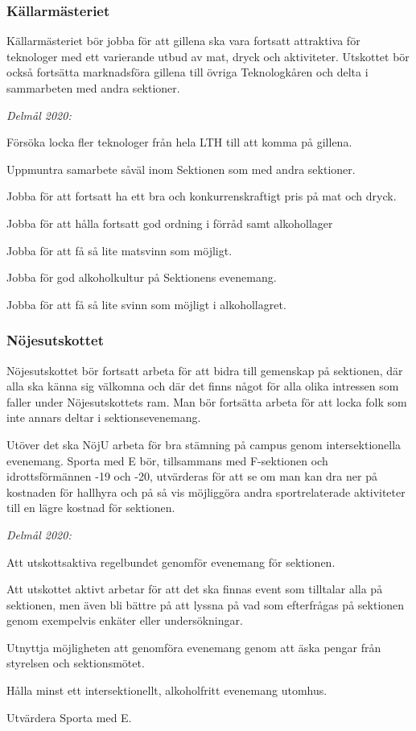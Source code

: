 \documentclass[../_main/handlingar.tex]{subfiles}
\begin{document}
\subsubsection*{Källarmästeriet}
Källarmästeriet bör jobba för att gillena ska vara fortsatt attraktiva för teknologer med ett varierande utbud av mat, dryck och aktiviteter. Utskottet bör också fortsätta marknadsföra gillena till övriga Teknologkåren och delta i sammarbeten med andra sektioner.

\emph{Delmål 2020:}
\begin{dashlist}
	\item Försöka locka fler teknologer från hela LTH till att komma på gillena.
	\item Uppmuntra samarbete såväl inom Sektionen som med andra sektioner.
	\item Jobba för att fortsatt ha ett bra och konkurrenskraftigt pris på mat och dryck.
	\item Jobba för att hålla fortsatt god ordning i förråd samt alkohollager
	\item Jobba för att få så lite matsvinn som möjligt.
	\item Jobba för god alkoholkultur på Sektionens evenemang.
	\item Jobba för att få så lite svinn som möjligt i alkohollagret.
\end{dashlist}
\newpage
\subsubsection*{Nöjesutskottet}
Nöjesutskottet bör fortsatt arbeta för att bidra till gemenskap på sektionen, där alla ska känna sig välkomna och där det finns något för alla olika intressen som faller under Nöjesutskottets ram. Man bör fortsätta arbeta för att locka folk som inte annars deltar i sektionsevenemang. 

Utöver det ska NöjU arbeta för bra stämning på campus genom intersektionella evenemang. Sporta med E bör, tillsammans med F-sektionen och idrottsförmännen -19 och -20, utvärderas för att se om man kan dra ner på kostnaden för hallhyra och på så vis möjliggöra andra sportrelaterade aktiviteter till en lägre kostnad för sektionen.  


\emph{Delmål 2020:}
\begin{dashlist}
	\item Att utskottsaktiva regelbundet genomför evenemang för sektionen.
	\item Att utskottet aktivt arbetar för att det ska finnas event som tilltalar alla på sektionen, men även bli bättre på att lyssna på vad som efterfrågas på sektionen genom exempelvis enkäter eller undersökningar.
	\item Utnyttja möjligheten att genomföra evenemang genom att äska pengar från styrelsen och sektionsmötet.
	\item Hålla minst ett intersektionellt, alkoholfritt evenemang utomhus.
	\item Utvärdera Sporta med E.
\end{dashlist}
\end{document}
